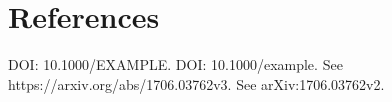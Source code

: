 \section{References}
\noindent DOI: 10.1000/EXAMPLE.
\noindent DOI: 10.1000/example.
See https://arxiv.org/abs/1706.03762v3.
See arXiv:1706.03762v2.
